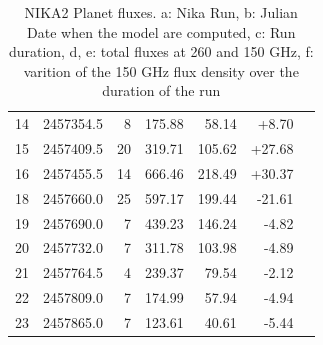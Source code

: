 \begin{table}
\begin{tabular}{|l|r|r|r|r|r|r|}
14 & 2457354.5 &  8 & 175.88 & 58.14 & +8.70\\
15 & 2457409.5 &  20 & 319.71 & 105.62 & +27.68\\
16 & 2457455.5 &  14 & 666.46 & 218.49 & +30.37\\
18 & 2457660.0 &  25 & 597.17 & 199.44 & -21.61\\
19 & 2457690.0 &  7 & 439.23 & 146.24 & -4.82\\
20 & 2457732.0 &  7 & 311.78 & 103.98 & -4.89\\
21 & 2457764.5 &  4 & 239.37 & 79.54 & -2.12\\
22 & 2457809.0 &  7 & 174.99 & 57.94 & -4.94\\
23 & 2457865.0 &  7 & 123.61 & 40.61 & -5.44\\
\hline
\end{tabular}
\caption{NIKA2 Planet fluxes. a: Nika Run, b: Julian Date when the
  model are computed, c: Run duration, d, e: total fluxes at 260 and
  150 GHz, f: varition of the 150 GHz flux density over the duration
  of the run}
\label{tab:fluxPred}
\end{table}



%





